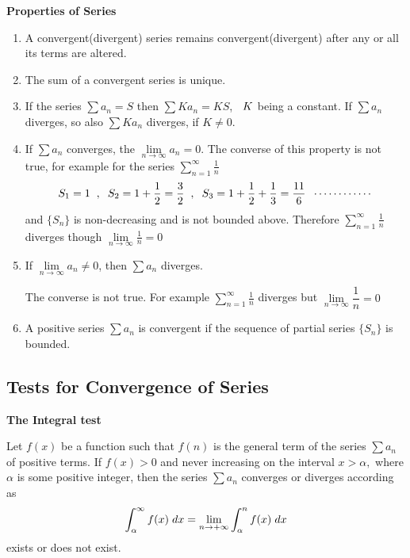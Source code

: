 \documentclass[11pt,a4paper]{article}
\theoremstyle{definition}
\newcommand{\subhead}[1]{%
  \par\medskip\noindent\textbf{#1}\par\nobreak\smallskip}
\begin{document}
\subhead{Properties of Series}
\begin{enumerate}
\item A convergent(divergent) series remains convergent(divergent) after any or all its terms are altered.

\item The sum of a convergent series is unique.

\item If the series $\sum a_n = S$ then $\sum K  a_n = KS$, $\hspace{0.2cm}K$ being a constant. If $\sum a_n$ diverges, so also $\sum Ka_n$ diverges, if $K\neq 0$.

\item If $\sum a_n$ converges, the $\displaystyle{\lim\limits_{n \rightarrow \infty} a_n = 0}$. The converse of this property is not true, for example for the series $\displaystyle{\sum^{\infty}_{n =1}\frac{1}{n}}$ $$S_1 = 1\hspace{0.2cm} , \hspace{0.2cm} S_2 = 1 + \frac{1}{2} = \frac{3}{2}\hspace{0.2cm},\hspace{0.2cm} S_3 = 1 + \frac{1}{2}+ \frac{1}{3} = \frac{11}{6}\hspace{0.2cm}\cdots\cdots\cdots\cdots$$ and $\{S_n\}$ is non-decreasing and is not bounded above. Therefore $\displaystyle{\sum^{\infty}_{n = 1}\frac{1}{n}}$ diverges though $\displaystyle{\lim\limits_{n \rightarrow \infty} \frac{1}{n} = 0}$

\item If $\lim\limits_{n \rightarrow \infty} a_n \neq 0$, then $\sum a_n$ diverges.

The converse is not true. For example $\displaystyle{\sum^{\infty}_{n=1}\frac{1}{n}}$ diverges but $\lim\limits_{n \rightarrow \infty} \dfrac{1}{n}=0$

\item A positive series $\sum a_n$ is convergent if the sequence of partial series $\{S_n\}$ is bounded.
\end{enumerate}

\subsection{Tests for Convergence of Series}

\subhead{The Integral test}
Let $f(x)$ be a function such that $f(n)$ is the general term of the series $\displaystyle{\sum a_n}$ of positive terms. If $f(x)>0$ and never increasing on the interval $x> \alpha,$ where $\alpha$ is some positive integer, then the series $\displaystyle{\sum a_n}$ converges or diverges according as 
$$\int^{\infty}_{\alpha}f(x)\hspace{0.1cm}dx = \lim_{n \rightarrow +\infty}\int^n_{\alpha}f(x)\hspace{0.1cm}dx$$ exists or does not exist.
\end{document}
